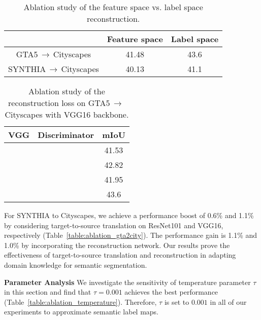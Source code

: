 \documentclass[runningheads]{llncs}
\begin{document}
	
	\begin{table}[t]
		\caption{Ablation study of the feature space vs. label space reconstruction.}
		\label{table:ablation_recons}
		
		\footnotesize
		\setlength\tabcolsep{10pt}
		\begin{center}
			\begin{tabularx}{.75\textwidth}{ ccc @{} }
				\toprule
& Feature space & Label space \\
				\midrule
				GTA5$\,\to\,$Cityscapes & 41.48 & 43.6 \\
				\midrule
				SYNTHIA$\,\to\,$Cityscapes & 40.13 & 41.1 \\
				\bottomrule
			\end{tabularx}
		\end{center}
		\vspace{-0.2in}
	\end{table}
	
	
\begin{wraptable}{r}{0.5\textwidth}
		\caption{Ablation study of the reconstruction loss on GTA5$\,\to\,$Cityscapes with VGG16 backbone.}
		\label{table:ablation_recons_loss}
		
		\footnotesize
		\setlength\tabcolsep{6pt}
		\begin{center}
			\begin{tabularx}{.4\textwidth}{ cc|c @{} }
				\toprule
VGG & Discriminator & mIoU \\
				\midrule
				& & 41.53 \\
				\cmark & & 42.82 \\
				& \cmark & 41.95 \\
				\cmark & \cmark & 43.6 \\
				\bottomrule
			\end{tabularx}
		\end{center}
\end{wraptable}
	
	For SYNTHIA to Cityscapes, we achieve a performance boost of 0.6\% and 1.1\% by considering target-to-source translation on ResNet101 and VGG16, respectively (Table~\ref{table:ablation_gta2city}). The performance gain is 1.1\% and 1.0\% by incorporating the reconstruction network. Our results prove the effectiveness of target-to-source translation and reconstruction in adapting domain knowledge for semantic segmentation.
	
	{\textbf{Parameter Analysis}} We investigate the sensitivity of temperature parameter $ \tau $ in this section and find that $ \tau=0.001 $ achieves the best performance (Table~\ref{table:ablation_temperature}). Therefore, $ \tau $ is set to $ 0.001 $ in all of our experiments to approximate semantic label maps. 
	
\end{document}
